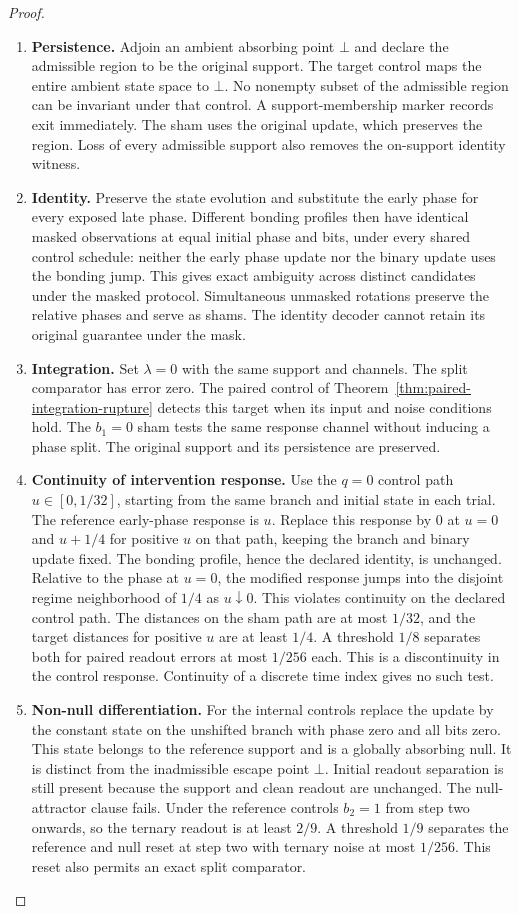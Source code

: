 \documentclass[11pt,a4paper]{article}
\theoremstyle{definition}
\begin{document}
\begin{proof}
\begin{enumerate}[leftmargin=*]
\item \textbf{Persistence.} Adjoin an ambient absorbing point $\bot$ and declare the admissible region to be the original support. The target control maps the entire ambient state space to $\bot$. No nonempty subset of the admissible region can be invariant under that control. A support-membership marker records exit immediately. The sham uses the original update, which preserves the region. Loss of every admissible support also removes the on-support identity witness.
\item \textbf{Identity.} Preserve the state evolution and substitute the early phase for every exposed late phase. Different bonding profiles then have identical masked observations at equal initial phase and bits, under every shared control schedule: neither the early phase update nor the binary update uses the bonding jump. This gives exact ambiguity across distinct candidates under the masked protocol. Simultaneous unmasked rotations preserve the relative phases and serve as shams. The identity decoder cannot retain its original guarantee under the mask.
\item \textbf{Integration.} Set $\lambda=0$ with the same support and channels. The split comparator has error zero. The paired control of Theorem~\ref{thm:paired-integration-rupture} detects this target when its input and noise conditions hold. The $b_1=0$ sham tests the same response channel without inducing a phase split. The original support and its persistence are preserved.
\item \textbf{Continuity of intervention response.} Use the $q=0$ control path $u\in[0,1/32]$, starting from the same branch and initial state in each trial. The reference early-phase response is $u$. Replace this response by $0$ at $u=0$ and $u+1/4$ for positive $u$ on that path, keeping the branch and binary update fixed. The bonding profile, hence the declared identity, is unchanged. Relative to the phase at $u=0$, the modified response jumps into the disjoint regime neighborhood of $1/4$ as $u\downarrow0$. This violates continuity on the declared control path. The distances on the sham path are at most $1/32$, and the target distances for positive $u$ are at least $1/4$. A threshold $1/8$ separates both for paired readout errors at most $1/256$ each. This is a discontinuity in the control response. Continuity of a discrete time index gives no such test.
\item \textbf{Non-null differentiation.} For the internal controls replace the update by the constant state on the unshifted branch with phase zero and all bits zero. This state belongs to the reference support and is a globally absorbing null. It is distinct from the inadmissible escape point $\bot$. Initial readout separation is still present because the support and clean readout are unchanged. The null-attractor clause fails. Under the reference controls $b_2=1$ from step two onwards, so the ternary readout is at least $2/9$. A threshold $1/9$ separates the reference and null reset at step two with ternary noise at most $1/256$. This reset also permits an exact split comparator.

\end{enumerate}
\end{proof}
\end{document}
